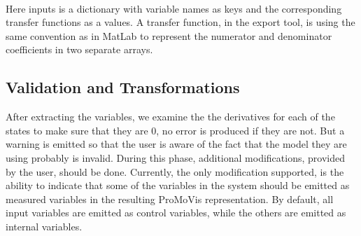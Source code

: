 \setlength\fboxsep{0pt}
\setlength\fboxrule{0.5pt}
\\\newline Here inputs is a dictionary with variable names as keys and the corresponding transfer functions as a values. A transfer function, in the export tool, is using the same convention as in MatLab to represent the numerator and denominator coefficients in two separate arrays.
\subsection{Validation and Transformations}
After extracting the variables, we examine the the derivatives for each of the states to make sure that they are 0, no error is produced if they are not. But a warning is emitted so that the user is aware of the fact that the model they are using probably is invalid. During this phase, additional modifications, provided by the user, should be done. Currently, the only modification supported, is the ability to indicate that some of the variables in the system should be emitted as measured variables in the resulting ProMoVis representation. By default, all input variables are emitted as control variables, while the others are emitted as internal variables.
